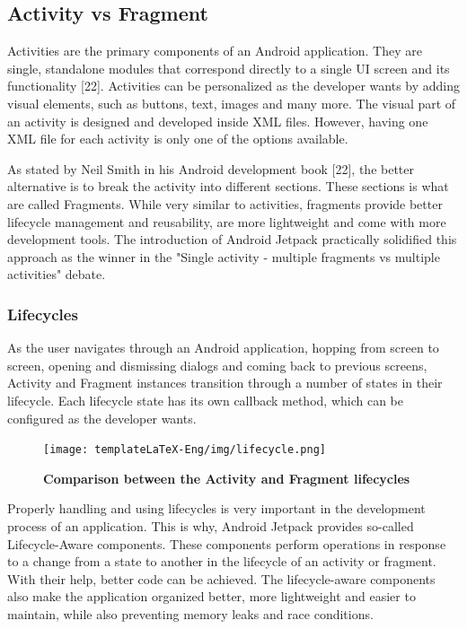\documentclass[12pt,a4paper,twoside]{report}
\begin{document}
 \subsection{Activity vs Fragment}
 Activities are the primary components of an Android application. They are single, standalone modules that correspond directly to a single UI screen and its functionality [22]. Activities can be personalized as the developer wants by adding visual elements, such as buttons, text, images and many more. The visual part of an activity is designed and developed inside XML files. However, having one XML file for each activity is only one of the options available.
 
 As stated by Neil Smith in his Android development book [22], the better alternative is to break the activity into different sections. These sections is what are called Fragments. While very similar to activities, fragments provide better lifecycle management and reusability, are more lightweight and come with more development tools. The introduction of Android Jetpack practically solidified this approach as the winner in the "Single activity - multiple fragments vs multiple activities" debate.
 
 \subsubsection{Lifecycles}
 
As the user navigates through an Android application, hopping from screen to screen, opening and dismissing dialogs and coming back to previous screens, Activity and Fragment instances transition through a number of states in their lifecycle. Each lifecycle state has its own callback method, which can be configured as the developer wants. 

\begin{figure}[H]
    \begin{center}
        \texttt{[image: templateLaTeX-Eng/img/lifecycle.png]}
        \caption{\bf Comparison between the Activity and Fragment lifecycles\footnotemark}
    \end{center}
\end{figure}

 
 Properly handling and using lifecycles is very important in the development process of an application. This is why, Android Jetpack provides so-called Lifecycle-Aware components. These components perform operations in response to a change from a state to another in the lifecycle of an activity or fragment. With their help, better code can be achieved. The lifecycle-aware components also make the application organized better, more lightweight and easier to maintain, while also preventing memory leaks and race conditions. 
 
\end{document}
